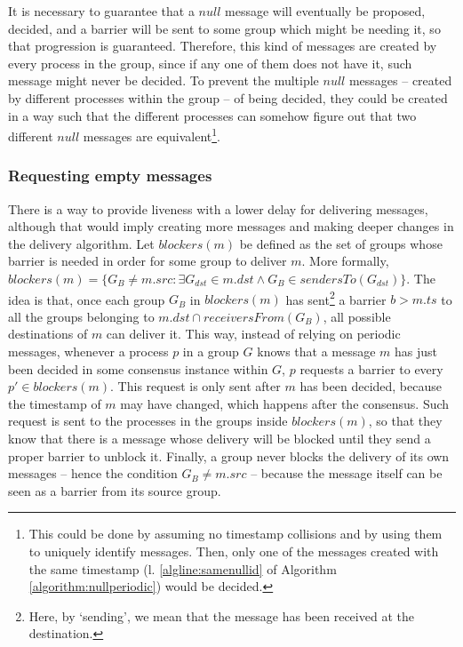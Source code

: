 \documentclass[times, 10pt]{article}
\begin{document}
It is necessary to guarantee that a $null$ message will eventually be proposed, decided, and a barrier will be sent to some group which might be needing it, so that progression is guaranteed. Therefore, this kind of messages are created by every process in the group, since if any one of them does not have it, such message might never be decided. %
To prevent the multiple $null$ messages -- created by different processes within the group -- of being decided, they could be created in a way such that the different processes can somehow figure out that two different $null$ messages are equivalent\footnote{This could be done by assuming no timestamp collisions and by using them to uniquely identify messages. Then, only one of the messages created with the same timestamp (l. \ref{algline:samenullid} of Algorithm \ref{algorithm:nullperiodic}) would be decided.}.




\subsubsection{Requesting empty messages}
\label{sec:nullondemand}

There is a way to provide liveness with a lower delay for delivering messages, although that would imply creating more messages and making deeper changes in the delivery algorithm. Let $blockers(m)$ be defined as the set of groups whose barrier is needed in order for some group to deliver $m$. More formally, \mbox{$blockers(m) = \{G_B \neq m.src : \exists G_{dst} \in m.dst \wedge G_B \in sendersTo(G_{dst})\}$}. The idea is that, once each group $G_B$ in $blockers(m)$ has sent\footnote{Here, by `sending', we mean that the message has been received at the destination.} a barrier $b > m.ts$ to all the groups belonging to \mbox{$m.dst \cap receiversFrom(G_B)$}, all possible destinations of $m$ can deliver it. This way, instead of relying on periodic messages, whenever a process $p$ in a group $G$ knows that a message $m$ has just been decided in some consensus instance within $G$, $p$ requests a barrier to every $p' \in blockers(m)$. This request is only sent after $m$ has been decided, because the timestamp of $m$ may have changed, which happens after the consensus. Such request is sent to the processes in the groups inside $blockers(m)$, so that they know that there is a message whose delivery will be blocked until they send a proper barrier to unblock it. Finally, a group never blocks the delivery of its own messages -- hence the condition $G_B \neq m.src$ -- because the message itself can be seen as a barrier from its source group.
\end{document}
